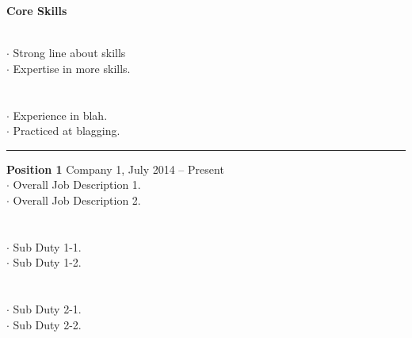 \documentclass[letterpaper, onecolumn, oneside]{article}
\newcommand{\dotindent}{\hspace*{.25in}$\cdot$ }
\newcommand{\spaceindent}{\hspace*{0.1in}}
\begin{document}
\begin{flushleft}


\textbf{\large Core Skills}
\vspace*{0.05in}

\spaceindent {\bf Skill Set 1} \\
\dotindent Strong line about skills \\
\dotindent Expertise in more skills.\\
~\\

\spaceindent {\bf Skill Set 2} \\
\dotindent Experience in blah. \\
\dotindent Practiced at blagging. \\

\textcolor{litegrey}{\rule{\textwidth}{.1pt}}


\vspace*{0.1in}



\textbf{\large Position 1} Company 1, July 2014 -- Present \\
\dotindent Overall Job Description 1. \\
\dotindent Overall Job Description 2.\\
~\\

\spaceindent {\bf Major Sub Duty 1} \\
\dotindent Sub Duty 1-1.\\
\dotindent Sub Duty 1-2.\\
~\\

\spaceindent {\bf Major Sub Duty 2} \\
\dotindent Sub Duty 2-1.\\
\dotindent Sub Duty 2-2.\\
~\\


\end{flushleft}
\end{document}
